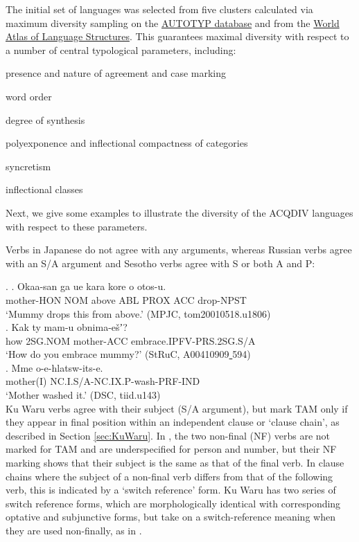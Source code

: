 \documentclass[a4paper, 11pt]{book}
\newcommand{\source}[1]{\hfill (#1)\\[-0.2cm]}	%
\newcommand{\und}{\underline{{ }}\hspace{0.2mm}}	%
\begin{document}
The initial set of languages was selected from five clusters calculated via maximum diversity sampling \citep{Stoll_etal2013a} on the \href{http://www.autotyp.uzh.ch}{AUTOTYP database} and from the \href{http://wals.info}{World Atlas of Language Structures}. This guarantees maximal diversity with respect to a number of central typological parameters, including: 

\begin{itemize*}
	\item presence and nature of agreement and case marking
	\item word order
	\item degree of synthesis
	\item polyexponence and inflectional compactness of categories
	\item syncretism
	\item inflectional classes
\end{itemize*}

\noindent Next, we give some examples to illustrate the diversity of the ACQDIV languages with respect to these parameters. 

Verbs in Japanese \Next[a] do not agree with any arguments, whereas Russian verbs \Next[b] agree with an S/A argument and Sesotho verbs \Next[c] agree with S or both A and P:

\ex.
	\ag. Okaa-san ga ue kara kore o otos-u. \\
		mother-HON NOM above ABL PROX ACC drop-NPST \\
		‘Mummy drops this from above.’ \source{MPJC, tom20010518.u1806}
	\bg. Kak ty mam-u obnima-ešʼ? \\
		how 2SG.NOM mother-ACC embrace.IPFV-PRS.2SG.S/A \\
		‘How do you embrace mummy?’ \source{StRuC, A00410909\und 594}
	\cg. Mme o-e-hlatsw-its-e. \\
		mother(I) NC.I.S/A-NC.IX.P-wash-PRF-IND \\
		‘Mother washed it.’ \source{DSC, tiid.u143}


Ku Waru verbs agree with their subject (S/A argument), but mark TAM only if they appear in final position within an independent clause or ‘clause chain’, as described in Section \ref{sec:KuWaru}. In  \Next[a], the two non-final (NF) verbs are not marked for TAM and are underspecified for person and number, but their NF marking shows that their subject is the same as that of the final verb. In clause chains where the subject of a non-final verb differs from that of the following verb, this is indicated by a ‘switch reference’ form. Ku Waru has two series of switch reference forms, which are morphologically identical with corresponding optative and subjunctive forms, but take on a switch-reference meaning when they are used non-finally, as in \Next[b].
\end{document}
